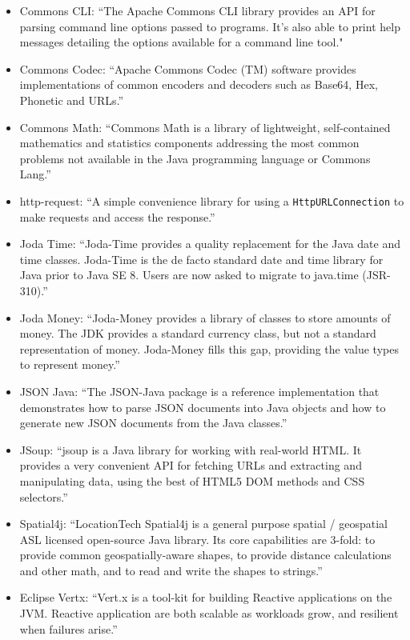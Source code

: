 \documentclass[sigconf]{acmart}
\begin{document}
\begin{itemize}
  \item{Commons CLI}: ``The Apache Commons CLI library provides an API for parsing command line options 
  passed to programs. It's also able to print help messages detailing the options available for a 
  command line tool." \cite{web:commonscli} 
  \item{Commons Codec}: ``Apache Commons Codec (TM) software provides implementations of common 
  encoders and decoders such as Base64, Hex, Phonetic and URLs.'' \cite{web:commonscodec}
  \item{Commons Math}: ``Commons Math is a library of lightweight, self-contained mathematics and 
  statistics components addressing the most common problems not available in the Java programming
   language or Commons Lang.'' \cite{web:commonsmath}
  \item{http-request}: ``A simple convenience library for using a \linebreak
  \verb|HttpURLConnection| to make requests and access the response.'' \cite{web:httpreq}
  \item{Joda Time}: ``Joda-Time provides a quality replacement for the Java date and time classes.
  Joda-Time is the de facto standard date and time library for Java prior to Java SE 8. Users are
   now asked to migrate to java.time (JSR-310).'' \cite{web:jodatime}
  \item{Joda Money}: ``Joda-Money provides a library of classes to store amounts of money.
  The JDK provides a standard currency class, but not a standard representation of money. 
  Joda-Money fills this gap, providing the value types to represent money.'' \cite{web:jodamoney}
  \item{JSON Java}: ``The JSON-Java package is a reference implementation that demonstrates 
  how to parse JSON documents into Java objects and how to generate new JSON documents
  from the Java classes.'' \cite{web:jsonjava}
  \item{JSoup}: ``jsoup is a Java library for working with real-world HTML. It provides a very 
  convenient API for fetching URLs and extracting and manipulating data, using the best of HTML5 
  DOM methods and CSS selectors.'' \cite{web:jsoup}
  \item{Spatial4j}: ``LocationTech Spatial4j is a general purpose spatial / geospatial ASL licensed 
  open-source Java library. Its core capabilities are 3-fold: to provide common geospatially-aware 
  shapes, to provide distance calculations and other math, and to read and write the shapes 
  to strings.'' \cite{web:spatial4j}
  \item{Eclipse Vertx}: ``Vert.x is a tool-kit for building Reactive applications on the JVM. 
  Reactive application are both scalable as workloads grow, and resilient
  when failures arise.'' \cite{web:vertx}
\end{itemize}
\end{document}
